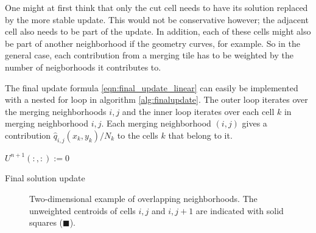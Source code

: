 One might at first think that only the cut cell needs to have its solution replaced
by the more stable update.  This would not be conservative however; the adjacent cell
also needs to be part of the update. In addition, each of these cells might also be part of
another neighborhood if the geometry curves, for example. So in the general case,
each contribution from a merging tile has to be weighted by the number of
neigborhoods it contributes to. 


The final update formula \eqref{eqn:final_update_linear} can easily be implemented with a 
nested for loop in algorithm \ref{alg:finalupdate}.  
The outer loop iterates over the merging neighborhoods $i,j$ and the inner loop 
iterates over each cell $k$ in merging neighborhood $i,j$.  Each merging 
neighborhood $(i,j)$ gives a contribution $ \hat{q}_{i,j}(x_{k}, y_k)/N_{k} $ to the 
cells $k$ that belong to it.

\begin{algorithm}[H]
\SetAlgoLined
$U^{n+1}(:,:) := 0$\\
 \caption{\sf Final solution update} \label{alg:finalupdate}
\end{algorithm}

\begin{figure}
	\hfill
	\caption{\sf Two-dimensional example of overlapping neighborhoods.  The unweighted centroids of cells $i,j$ and $i,j+1$ are indicated with solid squares ($\blacksquare$).} \label{fig:2nborTile}
\end{figure}

